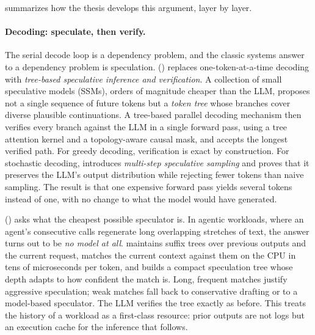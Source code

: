  summarizes how the thesis develops this argument, layer by layer.

\paragraph{Decoding: speculate, then verify.}
The serial decode loop is a dependency problem, and the classic systems answer to a dependency problem is speculation.
\SpecInfer () replaces one-token-at-a-time decoding with \emph{tree-based speculative inference and verification}.
A collection of small speculative models (SSMs), orders of magnitude cheaper than the LLM, proposes not a single sequence of future tokens but a \emph{token tree} whose branches cover diverse plausible continuations.
A tree-based parallel decoding mechanism then verifies every branch against the LLM in a single forward pass, using a tree attention kernel and a topology-aware causal mask, and accepts the longest verified path.
For greedy decoding, verification is exact by construction.
For stochastic decoding, \SpecInfer introduces \emph{multi-step speculative sampling} and proves that it preserves the LLM's output distribution while rejecting fewer tokens than naive sampling.
The result is that one expensive forward pass yields several tokens instead of one, with no change to what the model would have generated.

\SuffixDecoding () asks what the cheapest possible speculator is.
In agentic workloads, where an agent's consecutive calls regenerate long overlapping stretches of text, the answer turns out to be \emph{no model at all}.
\SuffixDecoding maintains suffix trees over previous outputs and the current request, matches the current context against them on the CPU in tens of microseconds per token, and builds a compact speculation tree whose depth adapts to how confident the match is.
Long, frequent matches justify aggressive speculation; weak matches fall back to conservative drafting or to a model-based speculator.
The LLM verifies the tree exactly as before.
This treats the history of a workload as a first-class resource: prior outputs are not logs but an execution cache for the inference that follows.


